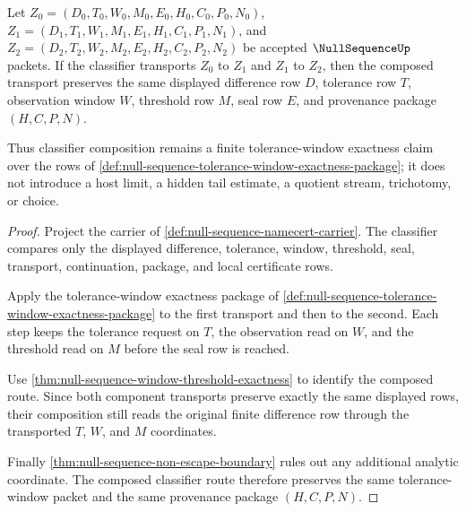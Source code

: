 \begin{theorem}
\label{thm:null-sequence-classifier-composition-window-exactness}
Let $Z_0=(D_0,T_0,W_0,M_0,E_0,H_0,C_0,P_0,N_0)$, $Z_1=(D_1,T_1,W_1,M_1,E_1,H_1,C_1,P_1,N_1)$, and $Z_2=(D_2,T_2,W_2,M_2,E_2,H_2,C_2,P_2,N_2)$ be accepted $\NullSequenceUp$ packets. If the classifier transports $Z_0$ to $Z_1$ and $Z_1$ to $Z_2$, then the composed transport preserves the same displayed difference row $D$, tolerance row $T$, observation window $W$, threshold row $M$, seal row $E$, and provenance package $(H,C,P,N)$.

Thus classifier composition remains a finite tolerance-window exactness claim over the rows of \autoref{def:null-sequence-tolerance-window-exactness-package}; it does not introduce a host limit, a hidden tail estimate, a quotient stream, trichotomy, or choice.
\end{theorem}
\begin{proof}
Project the carrier of \autoref{def:null-sequence-namecert-carrier}. The classifier compares only the displayed difference, tolerance, window, threshold, seal, transport, continuation, package, and local certificate rows.

Apply the tolerance-window exactness package of \autoref{def:null-sequence-tolerance-window-exactness-package} to the first transport and then to the second. Each step keeps the tolerance request on $T$, the observation read on $W$, and the threshold read on $M$ before the seal row is reached.

Use \autoref{thm:null-sequence-window-threshold-exactness} to identify the composed route. Since both component transports preserve exactly the same displayed rows, their composition still reads the original finite difference row through the transported $T$, $W$, and $M$ coordinates.

Finally \autoref{thm:null-sequence-non-escape-boundary} rules out any additional analytic coordinate. The composed classifier route therefore preserves the same tolerance-window packet and the same provenance package $(H,C,P,N)$.
\end{proof}

